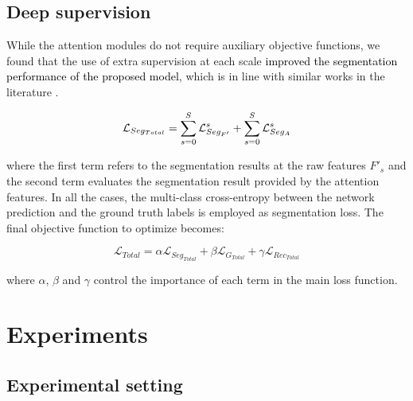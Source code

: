 \documentclass[journal]{IEEEtran}
\begin{document}
\subsection{Deep supervision}

While the attention modules do not require auxiliary objective functions, we found that the use of extra supervision at each scale \cite{lee2015deeply} \textcolor{black}{improved the segmentation performance of the proposed model}, which is in line with similar works in the literature \cite{chen2016attention,wang18d,schlemper2019attention}. 

\begin{equation}
   \mathcal{L}_{Seg_{Total}} = \sum_{s=0}^S\mathcal{L}_{Seg_{F'}}^s + \sum_{s=0}^S\mathcal{L}_{Se\textbf{\textbf{}}g_A}^s 
   \label{eq:seg_loss}
\end{equation}

where the first term refers to the segmentation results at the raw features $F'_s$ and the second term evaluates the segmentation result provided by the attention features. In all the cases, the multi-class cross-entropy between the network prediction and the ground truth labels is employed as segmentation loss. The final objective function to optimize becomes:


\begin{equation}
    \mathcal{L}_{Total} = \alpha \mathcal{L}_{Seg_{Total}} + \beta \mathcal{L}_{G_{Total}}
    + \gamma \mathcal{L}_{Rec_{Total}}
    \label{eq:total_loss}
\end{equation}

where $\alpha$, $\beta$ and $\gamma$ control the importance of each term in the main loss function.

\section{Experiments}
\label{sec:Experiments}




\subsection{\textbf{Experimental setting}}
\end{document}

